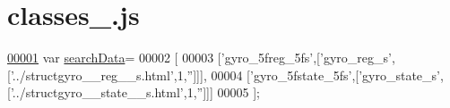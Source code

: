 \hypertarget{classes__3_8js_source}{}\section{classes\+\_.\+js}
\label{classes__3_8js_source}

\begin{DoxyCode}
\hypertarget{classes__3_8js_source.tex_l00001}{}\hyperlink{classes__3_8js_ad01a7523f103d6242ef9b0451861231e}{00001} var \hyperlink{classes__3_8js_ad01a7523f103d6242ef9b0451861231e}{searchData}=
00002 [
00003   [\textcolor{stringliteral}{'gyro\_5freg\_5fs'},[\textcolor{stringliteral}{'gyro\_reg\_s'},[\textcolor{stringliteral}{'../structgyro\_\_reg\_\_s.html'},1,\textcolor{stringliteral}{''}]]],
00004   [\textcolor{stringliteral}{'gyro\_5fstate\_5fs'},[\textcolor{stringliteral}{'gyro\_state\_s'},[\textcolor{stringliteral}{'../structgyro\_\_state\_\_s.html'},1,\textcolor{stringliteral}{''}]]]
00005 ];
\end{DoxyCode}
